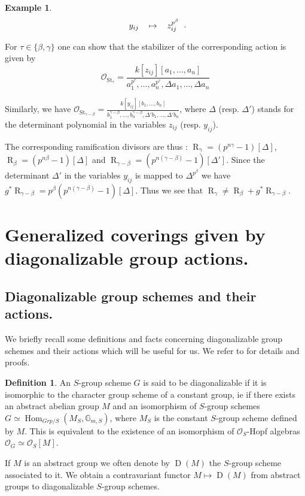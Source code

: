 \documentclass{amsart}
\theoremstyle{definition}
\newtheorem{defi}{Definition}[section]
\newtheorem{exam}{Example}[section]
\theoremstyle{remark}
\begin{document}
\begin{exam}
\[\begin{tabular}{ccc}
$y_{ij}$ & $\mapsto$ & $z_{ij}^{p^\beta}$ \\ 

\end{tabular}. \]

For $\tau \in \{\beta,\gamma \}$ one can show that the stabilizer of the corresponding action is given by \[ {{\mathcal O}}_{\operatorname{St}_\tau} = \frac{k[z_{ij}][a_1,\dots,a_n]}{a_1^{p^\tau},\dots,a_n^{p^\tau}, \Delta a_1,\dots,\Delta a_n} \] 

Similarly, we have ${{\mathcal O}}_{\operatorname{St}_{\gamma-\beta}} = \frac{k[y_{ij}][b_1,\dots,b_n]}{b_1^{\gamma-\beta},\dots,b_n^{\gamma-\beta}, \Delta'b_1,\dots,\Delta'b_n}$, where $\Delta$ (resp. $\Delta'$) stands for the determinant polynomial in the variables $z_{ij}$ (resp. $y_{ij}$). 

The corresponding ramification divisors are thus : $\operatorname{R}_\gamma = (p^{n\gamma}-1)[\Delta]$, $\operatorname{R}_\beta = (p^{n\beta}-1)[\Delta]$ and $\operatorname{R}_{\gamma-\beta}= (p^{n(\gamma-\beta)}-1)[\Delta']$.
Since the determinant $\Delta'$ in the variables $y_{ij}$ is mapped to $\Delta^{p^\beta}$ we have $g^*\operatorname{R}_{\gamma - \beta} = p^{\beta}(p^{n(\gamma - \beta)} -1)[\Delta]$.
Thus we see that $\operatorname{R}_\gamma \neq \operatorname{R}_\beta + g^*\operatorname{R}_{\gamma-\beta}$.

\end{exam}

\section{Generalized coverings given by diagonalizable group actions.}

\subsection{Diagonalizable group schemes and their actions.}

We briefly recall some definitions and facts concerning diagonalizable group schemes and their actions which will be useful for us. We refer to \cite[Exp. VIII]{SGA3} for details and proofs. 

\begin{defi}

An $S$-group scheme $G$ is said to be diagonalizable if it is isomorphic to the character group scheme of a constant group, ie if there exists an abstract abelian group $M$ and an isomorphism of $S$-group schemes $G \simeq \operatorname{Hom}_{Grp/S}(M_S, {\mathbb{G}}_{m,S})$, where $M_S$ is the constant $S$-group scheme defined by $M$. This is equivalent to the existence of an isomorphism of ${{\mathcal O}}_S$-Hopf algebras ${{\mathcal O}}_G \simeq {{\mathcal O}}_S[M]$.

If $M$ is an abstract group we often denote by $\operatorname{D}(M)$ the $S$-group scheme associated to it. We obtain a contravariant functor $M \mapsto \operatorname{D}(M)$ from abstract groups to diagonalizable $S$-group schemes.

\end{defi}
\end{document}
